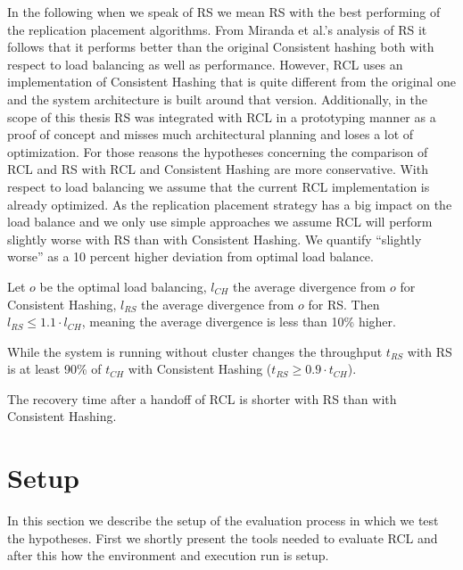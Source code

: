 In the following when we speak of \ac{RS} we mean \ac{RS} with the best performing of the replication placement algorithms.
From Miranda et al.'s analysis of \ac{RS}\cite{Miranda2014} it follows that it performs better than the original Consistent hashing both with respect to load balancing as well as performance.
However, \ac{RCL} uses an implementation of Consistent Hashing that is quite different from the original one and the system architecture is built around that version.
Additionally, in the scope of this thesis \ac{RS} was integrated with \ac{RCL} in a prototyping manner as a proof of concept and misses much architectural planning and loses a lot of optimization.
For those reasons the hypotheses concerning the comparison of \ac{RCL} and \ac{RS} with \ac{RCL} and Consistent Hashing are more conservative.
With respect to load balancing we assume that the current \ac{RCL} implementation is already optimized.
As the replication placement strategy has a big impact on the load balance and we only use simple approaches we assume \ac{RCL} will perform slightly worse with \ac{RS} than with Consistent Hashing.
We quantify ``slightly worse'' as a 10 percent higher deviation from optimal load balance.
\begin{hypothesis}
\label{hyp:load_balancing}
Let $o$ be the optimal load balancing, $l_{CH}$ the average divergence from $o$ for Consistent Hashing, $l_{RS}$ the average divergence from $o$ for \ac{RS}.
Then $l_{RS} \leq 1.1\cdot l_{CH}$, meaning the average divergence is less than 10\% higher.
\end{hypothesis}
\begin{hypothesis}
\label{hyp:throughput}
While the system is running without cluster changes the throughput $t_{RS}$ with \ac{RS} is at least 90\% of $t_{CH}$ with Consistent Hashing ($t_{RS} \geq 0.9\cdot t_{CH}$).
\end{hypothesis}
\begin{hypothesis}
\label{hyp:handoff}
The recovery time after a handoff of \ac{RCL} is shorter with \ac{RS} than with Consistent Hashing.
\end{hypothesis}

\section{Setup}
In this section we describe the setup of the evaluation process in which we test the hypotheses.
First we shortly present the tools needed to evaluate \ac{RCL} and after this how the environment and execution run is setup.


